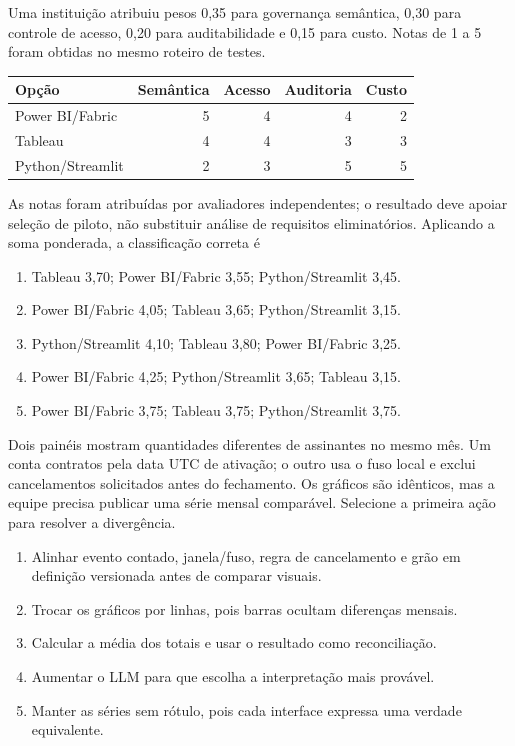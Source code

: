 \TextoBase
Uma instituição atribuiu pesos 0,35 para governança semântica, 0,30 para controle de acesso, 0,20 para auditabilidade e 0,15 para custo. Notas de 1 a 5 foram obtidas no mesmo roteiro de testes.
\begin{center}\small
\begin{tabularx}{\textwidth}{@{}Yrrrr@{}}\toprule
\textbf{Opção} & \textbf{Semântica} & \textbf{Acesso} & \textbf{Auditoria} & \textbf{Custo}\\\midrule
Power BI/Fabric & 5 & 4 & 4 & 2\\
Tableau & 4 & 4 & 3 & 3\\
Python/Streamlit & 2 & 3 & 5 & 5\\\bottomrule
\end{tabularx}\end{center}
\FonteDidatica
As notas foram atribuídas por avaliadores independentes; o resultado deve apoiar seleção de piloto, não substituir análise de requisitos eliminatórios.
\Comando Aplicando a soma ponderada, a classificação correta é
\begin{enumerate}[label=\Alph*)]
\item Tableau 3,70; Power BI/Fabric 3,55; Python/Streamlit 3,45.
\item Power BI/Fabric 4,05; Tableau 3,65; Python/Streamlit 3,15.
\item Python/Streamlit 4,10; Tableau 3,80; Power BI/Fabric 3,25.
\item Power BI/Fabric 4,25; Python/Streamlit 3,65; Tableau 3,15.
\item Power BI/Fabric 3,75; Tableau 3,75; Python/Streamlit 3,75.
\end{enumerate}

\TextoBase
Dois painéis mostram quantidades diferentes de assinantes no mesmo mês. Um conta contratos pela data UTC de ativação; o outro usa o fuso local e exclui cancelamentos solicitados antes do fechamento. Os gráficos são idênticos, mas a equipe precisa publicar uma série mensal comparável.
\FonteDidatica
\Comando Selecione a primeira ação para resolver a divergência.
\begin{enumerate}[label=\Alph*)]
\item Alinhar evento contado, janela/fuso, regra de cancelamento e grão em definição versionada antes de comparar visuais.
\item Trocar os gráficos por linhas, pois barras ocultam diferenças mensais.
\item Calcular a média dos totais e usar o resultado como reconciliação.
\item Aumentar o LLM para que escolha a interpretação mais provável.
\item Manter as séries sem rótulo, pois cada interface expressa uma verdade equivalente.
\end{enumerate}


